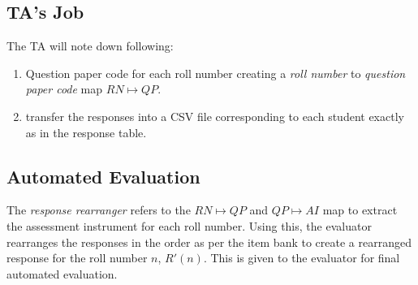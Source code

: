 \documentclass[12pt]{report}
\begin{document}
\subsection{TA's Job}
The TA will note down following:
\begin{enumerate}
\item Question paper code for each roll number creating a \emph{roll number} to \emph{question paper code} map $RN\mapsto QP$.
\item transfer the responses into a CSV file corresponding to each student exactly as in the response table.
\end{enumerate}

\subsection{Automated Evaluation}
The \emph{response rearranger} refers to the $RN\mapsto QP$ and $QP\mapsto AI$ map to extract the assessment instrument for each roll number. Using this, the evaluator rearranges the responses in the order as per the item bank to create a rearranged response for the roll number $n$, $R'(n)$. This is given to the evaluator for final automated evaluation.
\end{document}
